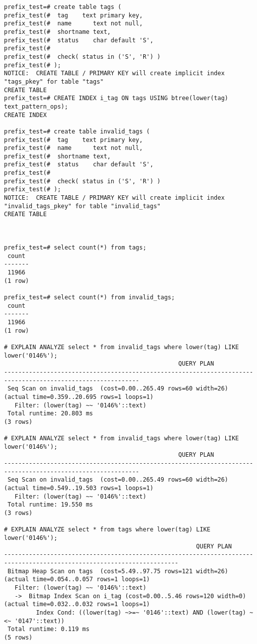\begin{lstlisting}[label=lst:snippets14,title=snippets/speed\_like.sql]
prefix_test=# create table tags (
prefix_test(#  tag    text primary key,
prefix_test(#  name      text not null,
prefix_test(#  shortname text,
prefix_test(#  status    char default 'S',
prefix_test(# 
prefix_test(#  check( status in ('S', 'R') )
prefix_test(# );
NOTICE:  CREATE TABLE / PRIMARY KEY will create implicit index "tags_pkey" for table "tags"
CREATE TABLE
prefix_test=# CREATE INDEX i_tag ON tags USING btree(lower(tag)  text_pattern_ops);
CREATE INDEX

prefix_test=# create table invalid_tags (
prefix_test(#  tag    text primary key,
prefix_test(#  name      text not null,
prefix_test(#  shortname text,
prefix_test(#  status    char default 'S',
prefix_test(# 
prefix_test(#  check( status in ('S', 'R') )
prefix_test(# );
NOTICE:  CREATE TABLE / PRIMARY KEY will create implicit index "invalid_tags_pkey" for table "invalid_tags"
CREATE TABLE



prefix_test=# select count(*) from tags;
 count 
-------
 11966
(1 row)

prefix_test=# select count(*) from invalid_tags;
 count 
-------
 11966
(1 row)

# EXPLAIN ANALYZE select * from invalid_tags where lower(tag) LIKE lower('0146%');
                                                 QUERY PLAN                                                 
------------------------------------------------------------------------------------------------------------
 Seq Scan on invalid_tags  (cost=0.00..265.49 rows=60 width=26) (actual time=0.359..20.695 rows=1 loops=1)
   Filter: (lower(tag) ~~ '0146%'::text)
 Total runtime: 20.803 ms
(3 rows)

# EXPLAIN ANALYZE select * from invalid_tags where lower(tag) LIKE lower('0146%');
                                                 QUERY PLAN                                                 
------------------------------------------------------------------------------------------------------------
 Seq Scan on invalid_tags  (cost=0.00..265.49 rows=60 width=26) (actual time=0.549..19.503 rows=1 loops=1)
   Filter: (lower(tag) ~~ '0146%'::text)
 Total runtime: 19.550 ms
(3 rows)

# EXPLAIN ANALYZE select * from tags where lower(tag) LIKE lower('0146%');
                                                      QUERY PLAN                                                       
-----------------------------------------------------------------------------------------------------------------------
 Bitmap Heap Scan on tags  (cost=5.49..97.75 rows=121 width=26) (actual time=0.054..0.057 rows=1 loops=1)
   Filter: (lower(tag) ~~ '0146%'::text)
   ->  Bitmap Index Scan on i_tag (cost=0.00..5.46 rows=120 width=0) (actual time=0.032..0.032 rows=1 loops=1)
         Index Cond: ((lower(tag) ~>=~ '0146'::text) AND (lower(tag) ~<~ '0147'::text))
 Total runtime: 0.119 ms
(5 rows)


\end{lstlisting}
